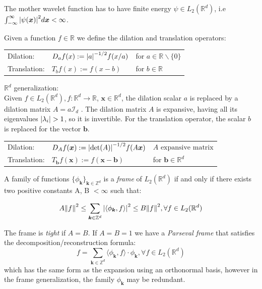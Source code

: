 The mother wavelet function has to have finite energy $\psi \in L_2(\mathbb{R}^d)$, i.e $\int_{-\infty}^{\infty}\abs{\psi(\bm{x})}^2 d\bm{x} < \infty $.\newline

\begin{definition}\label{def:D_T}
  Given a function $f\in\mathbb{R}$ we define the dilation and translation operators\cite{heil_continuous_1989}:\par
  \begin{tabular}{lll}
    Dilation:&  $D_a f(x):=\abs{a}^{-1/2}f(x/a)$ &for $a \in \mathbb{R}\backslash\{0\}$ \\
    Translation:&   $T_b f(x):=f(x-b)$ &for $b \in \mathbb{R}$ \\
  \end{tabular}

  $\mathbb{R}^d$ generalization:\\
  Given $f \in L_2(\mathbb{R}^d), f:\mathbb{R}^d \rightarrow \mathbb{R}$, $\bm{x}\in\mathbb{R}^d$, the dilation scalar $a$ is replaced by a dilation matrix $A = a \mathcal{I}_d$ \cite{qian_wavelet_2007}. The dilation matrix $A$ is expansive, having all its eigenvalues $\abs{\lambda_i} > 1$, so it is invertible. For the translation operator, the scalar $b$ is replaced for the vector $\bm{b}$.\par
  \begin{tabular}{lll}
    Dilation:& $D_A f(\bm{x}):=\abs{\det(A)}^{-1/2}f(A\bm{x})$ &$A \text{ expansive matrix}$\\
    Translation:&   $T_{\bm{b}} f(\bm{x}):=f(\bm{x}-\bm{b})$ &for $\bm{b} \in \mathbb{R}^d$ \\
  \end{tabular}
\end{definition}

\begin{definition}[Frame]\label{def:frame}
    A family of functions $\{\phi_{\bm{k}}\}_{ \bm{k}\in\mathbb{Z}^d}$ is a \textit{frame} of $L_2(\mathbb{R}^d)$ if and only if there exists two positive constants A, B $< \infty$ such that:

\begin{equation}
  A\norm{f}^2 \le \sum_{\bm{k}\in\mathbb{Z}^d}\abs{\langle\phi_{\bm{k}},f\rangle}^2 \le B\norm{f}^2, \forall f \in L_2(\mathbb{R}^d)
\end{equation}

The frame is \textit{tight} if $A=B$. If $A=B=1$ we have a \textit{Parseval frame} that satisfies the decomposition/reconstruction formula:
\begin{equation}
  f = \sum_{\bm{k}\in\mathbb{Z}^d}\langle\phi_{\bm{k}},f\rangle \cdot \phi_{\bm{k}}, \forall f \in L_2(\mathbb{R}^d)
\end{equation}
which has the same form as the expansion using an orthonormal basis, however in the frame generalization, the family $\phi_{\bm{k}}$ may be redundant.
\end{definition}


